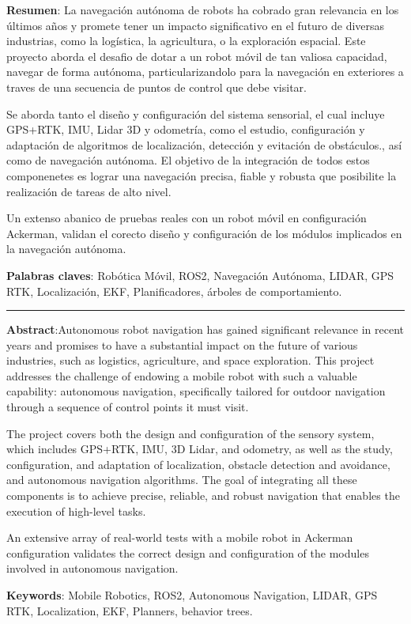 \textbf{Resumen}:
La navegación autónoma de robots ha cobrado gran relevancia en los últimos años y promete tener un impacto significativo en el futuro de diversas industrias, como la logística, la agricultura, o la exploración espacial. Este proyecto aborda el desafio de dotar a un robot móvil de tan valiosa capacidad, navegar de forma autónoma, particularizandolo para la navegación en exteriores a traves de una secuencia de puntos de control que debe visitar. 

Se aborda tanto el diseño y configuración del sistema sensorial, el cual  incluye GPS+RTK, IMU, Lidar 3D y odometría, como el estudio, configuración  y adaptación de algoritmos de localización, detección y evitación de obstáculos., así como de navegación autónoma. El objetivo de la integración de todos estos componenetes   es lograr una navegación precisa, fiable y robusta que posibilite la realización de tareas de alto nivel. 

Un extenso abanico de pruebas reales con un robot móvil en configuración Ackerman, validan el corecto diseño y configuración de los módulos implicados en la navegación autónoma.

\textbf{Palabras claves}: Robótica Móvil, ROS2, Navegación Autónoma, LIDAR, GPS RTK, Localización, EKF, Planificadores, árboles de comportamiento. 

\vspace{1cm}
\begin{center}
  \rule{0.5\textwidth}{.4pt}
\end{center}
\vspace{1cm}

\textbf{Abstract}:Autonomous robot navigation has gained significant relevance in recent years and promises to have a substantial impact on the future of various industries, such as logistics, agriculture, and space exploration. This project addresses the challenge of endowing a mobile robot with such a valuable capability: autonomous navigation, specifically tailored for outdoor navigation through a sequence of control points it must visit.

The project covers both the design and configuration of the sensory system, which includes GPS+RTK, IMU, 3D Lidar, and odometry, as well as the study, configuration, and adaptation of localization, obstacle detection and avoidance, and autonomous navigation algorithms. The goal of integrating all these components is to achieve precise, reliable, and robust navigation that enables the execution of high-level tasks.

An extensive array of real-world tests with a mobile robot in Ackerman configuration validates the correct design and configuration of the modules involved in autonomous navigation.

\textbf{Keywords}: Mobile Robotics, ROS2, Autonomous Navigation, LIDAR, GPS RTK, Localization, EKF, Planners, behavior trees.
